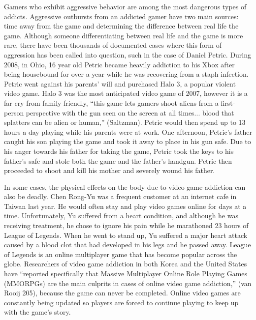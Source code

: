 \documentclass[a4paper,man,natbib]{apa6}
\renewcommand{\paragraph}{}
\begin{document}
\paragraph{}Gamers who exhibit aggressive behavior are among the most dangerous types of addicts. Aggressive outbursts from an addicted gamer have two main sources: time away from the game and determining the difference between real life the game. Although someone differentiating between real life and the game is more rare, there have been thousands of documented cases where this form of aggression has been called into question, such in the case of Daniel Petric. During 2008, in Ohio, 16 year old Petric became heavily addiction to his Xbox after being housebound for over a year while he was recovering from a staph infection. Petric went against his parents’ will and purchased Halo 3, a popular violent video game. Halo 3 was the most anticipated video game of 2007, however it is a far cry from family friendly, “this game lets gamers shoot aliens from a first-person perspective with the gun seen on the screen at all times... blood that splatters can be alien or human,” (Saltzman). Petric would then spend up to 13 hours a day playing while his parents were at work. One afternoon, Petric’s father caught his son playing the game and took it away to place in his gun safe. Due to his anger towards his father for taking the game, Petric took the keys to his father’s safe and stole both the game and the father’s handgun. Petric then proceeded to shoot and kill his mother and severely wound his father. 

\paragraph{}In some cases, the physical effects on the body due to video game addiction can also be deadly. Chen Rong-Yu was a frequent customer at an internet cafe in Taiwan last year. He would often stay and play video games online for days at a time. Unfortunately, Yu suffered from a heart condition, and although he was receiving treatment, he chose to ignore his pain while he marathoned 23 hours of League of Legends. When he went to stand up, Yu suffered a major heart attack caused by a blood clot that had developed in his legs and he passed away. League of Legends is an online multiplayer game that has become popular across the globe. Researchers of video game addiction in both Korea and the United States have “reported specifically that Massive Multiplayer Online Role Playing Games (MMORPGs) are the main culprits in cases of online video game addiction,” (van Rooij 205), because the game can never be completed. Online video games are constantly being updated so players are forced to continue playing to keep up with the game’s story. 
\end{document}
